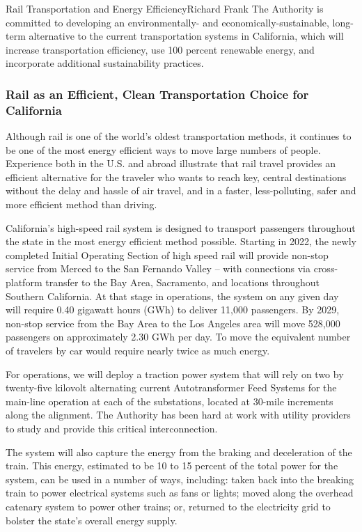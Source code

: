 \documentclass[10pt]{papertex}
\begin{document}
\begin{news}{2}{Rail Transportation and Energy Efficiency}{Richard Frank}{}{}
The Authority is committed to developing an environmentally- and 
economically-sustainable, long-term alternative to the current transportation 
systems in California, which will increase transportation efficiency, use 100 
percent renewable energy, and incorporate additional sustainability practices.


\subsubsection*{Rail as an Efficient, Clean Transportation Choice for
    California}

Although rail is one of the world’s oldest transportation methods, it continues 
to be one of the most energy efficient ways to move large numbers of people. 
Experience both in the U.S. and abroad illustrate that rail travel provides an 
efficient alternative for the traveler who wants to reach key, central 
destinations without the delay and hassle of air travel, and in a faster, 
less-polluting, safer and more efficient method than driving.

California’s high-speed rail system is designed to transport passengers 
throughout the state in the most energy efficient method possible. Starting in 
2022, the newly completed Initial Operating Section of high speed rail will 
provide non-stop service from Merced to the San Fernando Valley – with 
connections via cross-platform transfer to the Bay Area, Sacramento, and 
locations throughout Southern California. At that stage in operations, the 
system on any given day will require 0.40 gigawatt hours (GWh) to deliver 
11,000 passengers.  By 2029, non-stop service from the Bay Area to the Los 
Angeles area will move 528,000 passengers on approximately 2.30 GWh per day. 
To move the equivalent number of travelers by car would require nearly twice 
as much energy.

For operations, we will deploy a traction power system that will rely on two 
by twenty-five kilovolt alternating current Autotransformer Feed Systems for 
the main-line operation at each of the substations, located at 30-mile 
increments along the alignment.  The Authority has been hard at work with 
utility providers to study and provide this critical interconnection.

The system will also capture the energy from the braking and deceleration of 
the train. This energy, estimated to be 10 to 15 percent of the total power 
for the system, can be used in a number of ways, including: taken back into 
the breaking train to power electrical systems such as fans or lights; moved 
along the overhead catenary system to power other trains; or, returned to the 
electricity grid to bolster the state’s overall energy supply.


\end{news}
\end{document}
